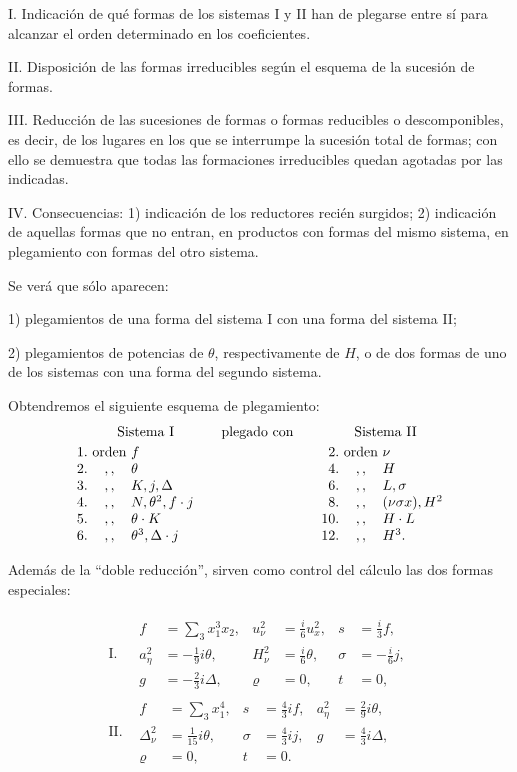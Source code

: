 \documentclass[11pt]{article}
\newcommand{\A}{\Delta}
\begin{document}
I. Indicación de qué formas de los sistemas I y II han de plegarse entre sí para alcanzar el orden determinado en los coeficientes.

II. Disposición de las formas irreducibles según el esquema de la sucesión de formas.

III. Reducción de las sucesiones de formas o formas reducibles o descomponibles, es decir, de los lugares en los que se interrumpe la sucesión total de formas; con ello se demuestra que todas las formaciones irreducibles quedan agotadas por las indicadas.

IV. Consecuencias: 1) indicación de los reductores recién surgidos; 2) indicación de aquellas formas que no entran, en productos con formas del mismo sistema, en plegamiento con formas del otro sistema.

Se verá que sólo aparecen:

1) plegamientos de una forma del sistema I con una forma del sistema II;

2) plegamientos de potencias de $\theta$, respectivamente de $H$, o de dos formas de uno de los sistemas con una forma del segundo sistema.

Obtendremos el siguiente esquema de plegamiento:
\[
\begin{array}{r@{\ }c@{\ }l@{\qquad}c@{\qquad}r@{\ }c@{\ }l}
\multicolumn{3}{c}{\text{Sistema I}} & \text{plegado con} & \multicolumn{3}{c}{\text{Sistema II}}\\[0.25em]
1. & \text{orden} & f & & 2. & \text{orden} & \nu\\
2. & ,, & \theta & & 4. & ,, & H\\
3. & ,, & K,j,\A & & 6. & ,, & L,\sigma\\
4. & ,, & N,\theta^2,f\cdot j & & 8. & ,, & (\nu\sigma x),H^2\\
5. & ,, & \theta\cdot K & & 10. & ,, & H\cdot L\\
6. & ,, & \theta^3,\A\cdot j & & 12. & ,, & H^3.
\end{array}
\]

Además de la ``doble reducción'', sirven como control del cálculo las dos formas especiales:

\[
\begin{array}{ll}
\text{I.}&\begin{array}{rlrlrl}
f&=\displaystyle\sum_3x_1^3x_2,& u_\nu^2&=\frac{i}{6}u_x^2,& s&=\frac{i}{3}f,\\
a_\eta^2&=-\frac19 i\theta,& H_\nu^2&=\frac{i}{6}\theta,& \sigma&=-\frac{i}{6}j,\\
g&=-\frac23i\Delta,& \varrho&=0,& t&=0,
\end{array}\\[1.2em]
\text{II.}&\begin{array}{rlrlrl}
f&=\displaystyle\sum_3x_1^4,& s&=\frac43if,& a_\eta^2&=\frac29i\theta,\\
\Delta_\nu^2&=\frac1{15}i\theta,& \sigma&=\frac43ij,& g&=\frac43i\Delta,\\
\varrho&=0,& t&=0.
\end{array}
\end{array}
\]
\end{document}
